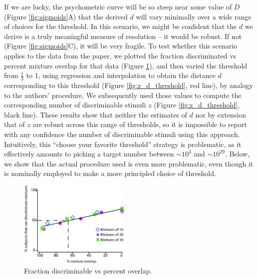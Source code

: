 \documentclass[letterpaper,twocolumn,10pt]{article}
\begin{document}
If we are lucky, the psychometric curve will be so steep near some value of $D$ (Figure \ref{fig:sigmoids}A) that the derived $d$ will vary minimally over a wide range of choices for the threshold.  
In this scenario, we might be confident that the $d$ we derive is a truly meaningful measure of resolution -- it would be robust.  
If not (Figure \ref{fig:sigmoids}C), it will be very fragile.  
To test whether this scenario applies to the data from the paper, we plotted the fraction discriminated vs percent mixture overlap for that data (Figure \ref{fig:hardthresh}), and then  
varied the threshold from $\frac{1}{3}$ to 1, 
using regression and interpolation to obtain the distance $d$ corresponding to this threshold (Figure \ref{fig:z_d_threshold}, red line), 
by analogy to the authors' procedure.  
We subsequently used those values to compute the corresponding number of discriminable stimuli $z$ (Figure \ref{fig:z_d_threshold}, black line).  
These results show that neither the estimates of $d$ nor by extension that of $z$ are robust across this range of thresholds, 
so it is impossible to report with any confidence the number of discriminable stimuli using this approach. 
Intuitively, this ``choose your favorite threshold'' strategy is problematic, 
as it effectively amounts to picking a target number between $\sim 10^{3}$ and $\sim 10^{29}$. 
Below, we show that the actual procedure used is even more problematic, 
even though it is nominally employed to make a more principled choice of threshold. 

\begin{figure}
    \centering
    \includegraphics[width=0.475\textwidth]{figures/Fig6_HardThresh}
    \caption{
Fraction discriminable vs percent overlap.}
    \label{fig:hardthresh}
\end{figure} 
\end{document}

